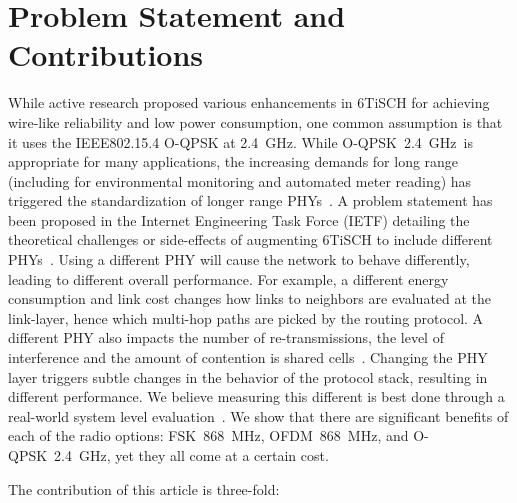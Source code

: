 \documentclass[sensors,article,submit,moreauthors,pdftex]{Definitions/mdpi}
\newcommand{\fsk}           {FSK~868~MHz}
\newcommand{\oqpsk}         {O-QPSK~2.4~GHz}
\newcommand{\ofdm}          {OFDM~868~MHz}
\begin{document}
\section{Problem Statement and Contributions}
\label{sec:contributions}


While active research proposed various enhancements in 6TiSCH  for achieving wire-like reliability and low power consumption,
    one common assumption is that it uses the IEEE802.15.4 O-QPSK at 2.4~GHz.
While \oqpsk\ is appropriate for many applications,
   the increasing demands for long range (including for environmental monitoring and automated meter reading) has triggered the standardization of longer range PHYs~\cite{munoz18evaluation}.
A problem statement has been proposed in the Internet Engineering Task Force (IETF) detailing the theoretical challenges or side-effects of augmenting 6TiSCH to include different PHYs~\cite{draft-munoz-6tisch-multi-phy-nodes}. 
Using a different PHY will cause the network to behave differently, leading to different overall performance.
For example, a different energy consumption and link cost changes how links to neighbors are evaluated at the link-layer,
    hence which multi-hop paths are picked by the routing protocol.
A different PHY also impacts
    the number of re-transmissions,
    the level of interference and
    the amount of contention is shared cells~\cite{kim15hybrid}.
Changing the PHY layer triggers subtle changes in the behavior of the protocol stack,
    resulting in different performance.
We believe measuring this different is best done through a real-world system level evaluation~\cite{saltzer84endtoend}.
We show that there are significant benefits of each of the radio options: \fsk, \ofdm, and \oqpsk, yet they all come at a certain cost.


The contribution of this article is three-fold:
\end{document}
